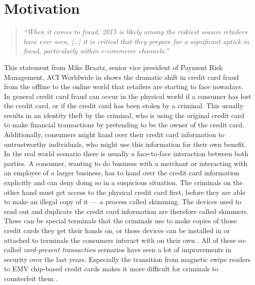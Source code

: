 
\section{Motivation}
\label{sec:motivation}

\begin{quotation}
    \textit{\enquote{When it comes to fraud, 2015 is likely among the riskiest season retailers have ever seen, […]
    it is critical that they prepare for a significant uptick in fraud, particularly within e-commerce channels.} \citep{Reuters2015}}
\end{quotation}

This statement from Mike Braatz, senior vice president of Payment Risk Management, ACI Worldwide in \citep{Reuters2015} shows the dramatic shift in credit card fraud from the offline to the online world that retailers are starting to face nowadays. \\

In general credit card fraud can occur in the physical world if a consumer has lost the credit card, or if the credit card has been stolen by a criminal. This usually results in an identity theft by the criminal, who is using the original credit card to make financial transactions by pretending to be the owner of the credit card. Additionally, consumers might hand over their credit card information to untrustworthy individuals, who might use this information for their own benefit. In the real world scenario there is usually a face-to-face interaction between both parties. A consumer, wanting to do business with a merchant or interacting with an employee of a larger business, has to hand over the credit card information explicitly and can deny doing so in a suspicious situation. The criminals on the other hand must get access to the physical credit card first, before they are able to make an illegal copy of it --- a process called skimming. The devices used to read out and duplicate the credit card information are therefore called skimmers. These can be special terminals that the criminals use to make copies of those credit cards they get their hands on, or those devices can be installed in or attached to terminals the consumers interact with on their own \citep{ConsumerAction2009}. All of these so-called \emph{card-present transaction} scenarios have seen a lot of improvements in security over the last years. Especially the transition from magnetic swipe readers to \gls{EMV} chip-based credit cards makes it more difficult for criminals to counterfeit them \citep{Lewis2015}. \\

